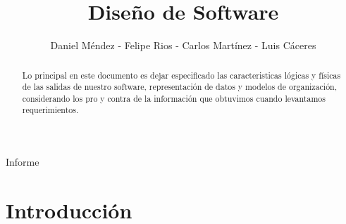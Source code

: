 \documentclass[twocolumn,11pts]{IEEEtran}
\begin{document}
\let\orilabel\label

%
\title{Diseño de Software}
%

\author{Daniel Méndez - Felipe Rios - Carlos Martínez - Luis Cáceres
}
% 
%


%
{Informe}%

\maketitle


\begin{abstract}
Lo principal en este documento es dejar especificado las caracteristicas lógicas y físicas de las salidas de nuestro software, representación de datos y modelos de organización, considerando los pro y contra de la información que obtuvimos cuando levantamos requerimientos.
\end{abstract}

\section{Introducción}
\end{document}
